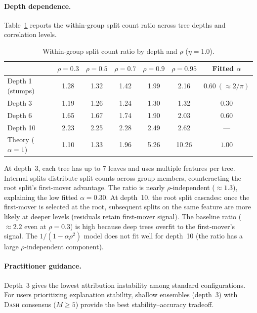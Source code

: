 \documentclass{jmlr}
\newcommand{\DASH}{\textsc{Dash}}
\begin{document}
\paragraph{Depth dependence.}
Table~\ref{tab:depth-rho} reports the within-group split count ratio across tree depths and correlation levels.

\begin{table}[t]
\centering
\caption{Within-group split count ratio by depth and $\rho$ ($\eta{=}1.0$).}
\label{tab:depth-rho}
\small
\begin{tabular}{@{}lcccccc@{}}
\toprule
 & $\rho{=}0.3$ & $\rho{=}0.5$ & $\rho{=}0.7$ & $\rho{=}0.9$ & $\rho{=}0.95$ & Fitted $\alpha$ \\
\midrule
Depth 1 (stumps) & 1.28 & 1.32 & 1.42 & 1.99 & 2.16 & $0.60\ (\approx 2/\pi)$ \\
Depth 3          & 1.19 & 1.26 & 1.24 & 1.30 & 1.32 & $0.30$ \\
Depth 6          & 1.65 & 1.67 & 1.74 & 1.90 & 2.03 & $0.60$ \\
Depth 10         & 2.23 & 2.25 & 2.28 & 2.49 & 2.62 & --- \\
\midrule
Theory ($\alpha{=}1$) & 1.10 & 1.33 & 1.96 & 5.26 & 10.26 & $1.00$ \\
\bottomrule
\end{tabular}
\end{table}

At depth~3, each tree has up to 7 leaves and uses multiple features per tree. Internal splits distribute split counts across group members, counteracting the root split's first-mover advantage. The ratio is nearly $\rho$-independent ($\approx 1.3$), explaining the low fitted $\alpha = 0.30$. At depth~10, the root split cascades: once the first-mover is selected at the root, subsequent splits on the same feature are more likely at deeper levels (residuals retain first-mover signal). The baseline ratio ($\approx 2.2$ even at $\rho = 0.3$) is high because deep trees overfit to the first-mover's signal. The $1/(1-\alpha\rho^2)$ model does not fit well for depth~10 (the ratio has a large $\rho$-independent component).

\paragraph{Practitioner guidance.}
Depth~3 gives the lowest attribution instability among standard configurations. For users prioritizing explanation stability, shallow ensembles (depth~3) with \DASH{} consensus ($M \geq 5$) provide the best stability--accuracy tradeoff.
\end{document}
